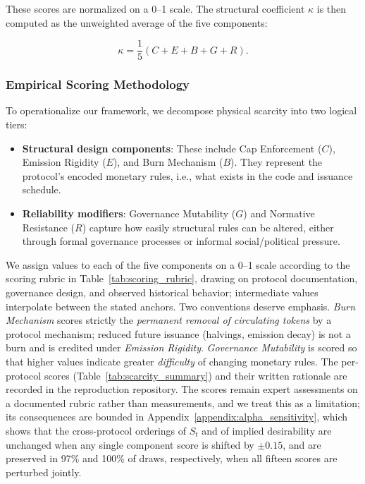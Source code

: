 \documentclass[12pt]{article}
\begin{document}
These scores are normalized on a 0–1 scale. The structural coefficient \( \kappa \) is then computed as the unweighted average of the five components:

\begin{equation}
\kappa = \frac{1}{5}(C + E + B + G + R).
\label{eq:kappa}
\end{equation}

\subsubsection{Empirical Scoring Methodology}

To operationalize our framework, we decompose physical scarcity into two logical tiers:  
\begin{itemize}
    \item \textbf{Structural design components}: These include Cap Enforcement (\(C\)), Emission Rigidity (\(E\)), and Burn Mechanism (\(B\)). They represent the protocol’s encoded monetary rules, i.e., what exists in the code and issuance schedule.
    \item \textbf{Reliability modifiers}: Governance Mutability (\(G\)) and Normative Resistance (\(R\)) capture how easily structural rules can be altered, either through formal governance processes or informal social/political pressure.
\end{itemize}

We assign values to each of the five components on a 0--1 scale according to the scoring rubric in Table~\ref{tab:scoring_rubric}, drawing on protocol documentation, governance design, and observed historical behavior; intermediate values interpolate between the stated anchors. Two conventions deserve emphasis. \textit{Burn Mechanism} scores strictly the \emph{permanent removal of circulating tokens} by a protocol mechanism; reduced future issuance (halvings, emission decay) is not a burn and is credited under \textit{Emission Rigidity}. \textit{Governance Mutability} is scored so that higher values indicate greater \emph{difficulty} of changing monetary rules. The per-protocol scores (Table~\ref{tab:scarcity_summary}) and their written rationale are recorded in the reproduction repository. The scores remain expert assessments on a documented rubric rather than measurements, and we treat this as a limitation; its consequences are bounded in Appendix~\ref{appendix:alpha_sensitivity}, which shows that the cross-protocol orderings of \( S_t \) and of implied desirability are unchanged when any single component score is shifted by \( \pm 0.15 \), and are preserved in 97\% and 100\% of draws, respectively, when all fifteen scores are perturbed jointly.
\end{document}
